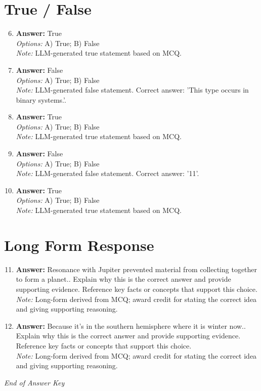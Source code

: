 \documentclass[12pt]{article}
\begin{document}
\section*{True / False}
\begin{enumerate}[label=\arabic*.]
\setcounter{enumi}{5}
\item \textbf{Answer:} True
\\ \textit{Options:} A) True; B) False
\\ \textit{Note:} LLM-generated true statement based on MCQ.
\item \textbf{Answer:} False
\\ \textit{Options:} A) True; B) False
\\ \textit{Note:} LLM-generated false statement. Correct answer: 'This type occurs in binary systems.'.
\item \textbf{Answer:} True
\\ \textit{Options:} A) True; B) False
\\ \textit{Note:} LLM-generated true statement based on MCQ.
\item \textbf{Answer:} False
\\ \textit{Options:} A) True; B) False
\\ \textit{Note:} LLM-generated false statement. Correct answer: '11'.
\item \textbf{Answer:} True
\\ \textit{Options:} A) True; B) False
\\ \textit{Note:} LLM-generated true statement based on MCQ.
\end{enumerate}

\section*{Long Form Response}
\begin{enumerate}[label=\arabic*.]
\setcounter{enumi}{10}
\item \textbf{Answer:} Resonance with Jupiter prevented material from collecting together to form a planet.. Explain why this is the correct answer and provide supporting evidence. Reference key facts or concepts that support this choice.
\\ \textit{Note:} Long-form derived from MCQ; award credit for stating the correct idea and giving supporting reasoning.
\item \textbf{Answer:} Because it's in the southern hemisphere where it is winter now.. Explain why this is the correct answer and provide supporting evidence. Reference key facts or concepts that support this choice.
\\ \textit{Note:} Long-form derived from MCQ; award credit for stating the correct idea and giving supporting reasoning.
\end{enumerate}

\vfill
\noindent\textit{End of Answer Key}
\end{document}
